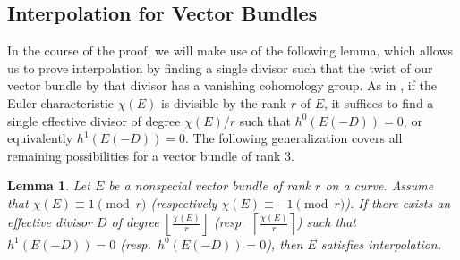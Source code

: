 \documentclass[11pt]{amsart}
\newtheorem{lem}[thm]{Lemma}
\theoremstyle{definition}
\theoremstyle{remark}
\begin{document}
\subsection{Interpolation for Vector Bundles}

In the course of the proof, we will make use of the following lemma, which allows us to prove interpolation by finding a single divisor such that the twist of our vector bundle by that divisor has a vanishing cohomology group.  As in \cite{vogt}, if the Euler characteristic $\chi(E)$ is divisible by the rank $r$ of $E$, it suffices to find a single effective divisor of degree $\chi(E)/r$ such that $h^0(E(-D)) = 0$, or equivalently $h^1(E(-D)) = 0$.  The following generalization covers all remaining possibilities for a vector bundle of rank $3$.

\begin{lem}\label{check_one}
Let $E$ be a nonspecial vector bundle of rank $r$ on a curve.  Assume that $\chi(E) \equiv 1 \pmod r$ (respectively $\chi(E) \equiv -1 \pmod r$). If there exists an effective divisor $D$ of degree $\left\lfloor \frac{\chi(E)}{r} \right\rfloor$ (resp.\ $\left\lceil \frac{\chi(E)}{r} \right\rceil$) such that $h^1(E(-D)) = 0$ (resp.\ $h^0(E(-D)) = 0$), then $E$ satisfies interpolation.
\end{lem}
\end{document}
